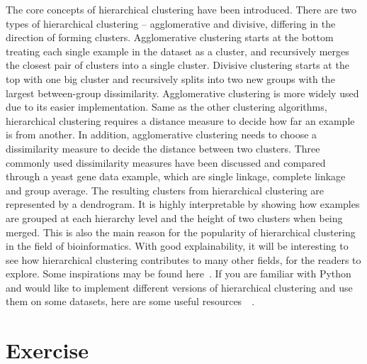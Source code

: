 The core concepts of hierarchical clustering have been introduced. There are two types of hierarchical clustering -- agglomerative and divisive, differing in the direction of forming clusters. Agglomerative clustering starts at the bottom treating each single example in the dataset as a cluster, and recursively merges the closest pair of clusters into a single cluster. Divisive clustering starts at the top with one big cluster and recursively splits into two new groups with the largest between-group dissimilarity. Agglomerative clustering is more widely used due to its easier implementation. Same as the other clustering algorithms, hierarchical clustering requires a distance measure to decide how far an example is from another. In addition, agglomerative clustering needs to choose a dissimilarity measure to decide the distance between two clusters. Three commonly used dissimilarity measures have been discussed and compared through a yeast gene data example, which are single linkage, complete linkage and group average. The resulting clusters from hierarchical clustering are represented by a dendrogram. It is highly interpretable by showing how examples are grouped at each hierarchy level and the height of two clusters when being merged. This is also the main reason for the popularity of hierarchical clustering in the field of bioinformatics. With good explainability, it will be interesting to see how hierarchical clustering contributes to many other fields, for the readers to explore. Some inspirations may be found here~\cite{Whittaker2019}. If you are familiar with Python and would like to implement different versions of hierarchical clustering and use them on some datasets, here are some useful resources~\cite{Sklearn2022}~\cite{Brownlee2020}. 

\section*{Exercise}


